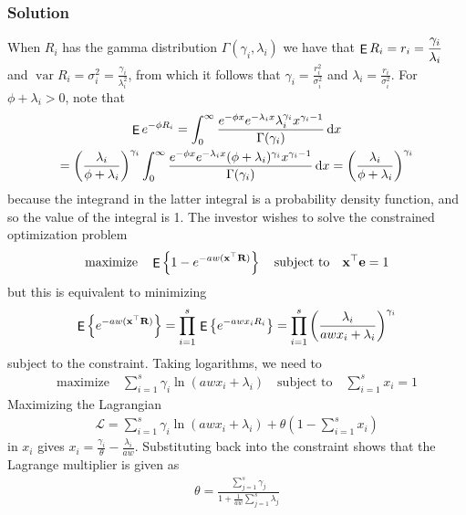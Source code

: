 \documentclass[10pt]{beamer}
\newcommand{\ds}{\displaystyle}
\DeclareMathOperator\expc{{\sf E}}
\DeclareMathOperator\var{var}
\theoremstyle{definition}
\begin{document}
\begin{frame}[allowframebreaks]
  \frametitle{Solution}
  When $R_i$ has the gamma distribution $\Gamma(\gamma_i, \lambda_i)$ we have that $\ds\expc{R_i} = r_i = \frac{\gamma_i}{\lambda_i}$ and $\ds\var{R_i} = \sigma_i^2 = \frac{\gamma_i}{\lambda_i^2}$, from which it follows that $\ds\gamma_i = \frac{r_i^2}{\sigma_i^2}$ and $\ds\lambda_i = \frac{r_i}{\sigma_i^2}$. For $\phi + \lambda_i > 0$, note that
  \begin{multline*}
    \expc{e^{-\phi R_i}} = \int_0^\infty \frac{e^{-\phi x}e^{-\lambda_i x}\lambda_i^{\gamma_i}x^{\gamma_i-1}}{\Gamma(\gamma_i)}\,\text{d}x \\= \left(\frac{\lambda_i}{\phi + \lambda_i}\right)^{\gamma_i} \int_0^\infty \frac{e^{-\phi x}e^{-\lambda_i x}(\phi + \lambda_i)^{\gamma_i}x^{\gamma_i-1}}{\Gamma(\gamma_i)}\,\text{d}x = \left(\frac{\lambda_i}{\phi + \lambda_i}\right)^{\gamma_i}
  \end{multline*}
  because the integrand in the latter integral is a probability density function, and so the value of the integral is 1. The investor wishes to solve the constrained optimization problem
  \begin{align*}
    \text{maximize}\quad \expc\left\{1 - e^{-aw(\mathbf{x}^\top\mathbf{R})}\right\} \quad\text{subject to}\quad \mathbf{x}^\top\mathbf{e} = 1
  \end{align*}
  but this is equivalent to minimizing
  \begin{align*}
    \expc\left\{e^{-aw(\mathbf{x}^\top\mathbf{R})}\right\} = \prod_{i=1}^s\,\expc\left\{e^{-awx_i R_i}\right\} = \prod_{i=1}^s \left(\frac{\lambda_i}{awx_i + \lambda_i}\right)^{\gamma_i}
  \end{align*}
  subject to the constraint. Taking logarithms, we need to
  \begin{align*}
    \text{maximize} \quad \sum_{i=1}^s \gamma_i \ln(awx_i + \lambda_i) \quad \text{subject to} \quad \sum_{i=1}^s x_i = 1
  \end{align*}
  Maximizing the Lagrangian
  \begin{align*}
    \mathcal{L} = \sum_{i=1}^s \gamma_i \ln(awx_i + \lambda_i) + \theta\left(1 - \sum_{i=1}^s x_i\right)
  \end{align*}
  in $x_i$ gives $\ds x_i = \frac{\gamma_i}{\theta} - \frac{\lambda_i}{aw}$. Substituting back into the constraint shows that the Lagrange multiplier is given as
  \begin{align*}
    \theta = \frac{\sum_{j=1}^s \gamma_j}{1 + \frac{1}{aw}\sum_{j=1}^s \lambda_j}

\end{align*}
\end{frame}
\end{document}
